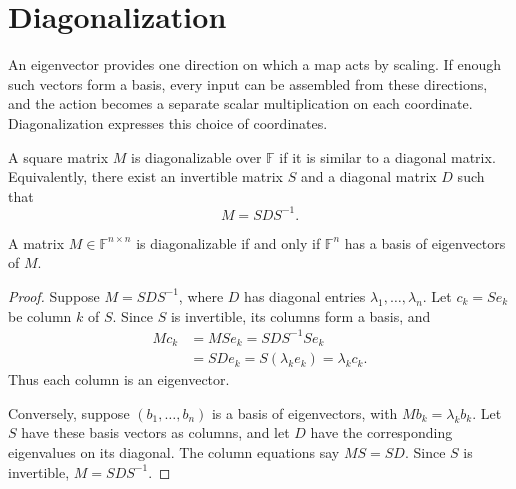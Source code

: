 \section{Diagonalization}
\label{sec:linear-algebra-i:diagonalization}

An eigenvector provides one direction on which a map acts by scaling.
If enough such vectors form a basis, every input can be assembled from
these directions, and the action becomes a separate scalar multiplication
on each coordinate. Diagonalization expresses this choice of coordinates.

\begin{definition}
  A square matrix \(M\) is diagonalizable over \(\mathbb F\) if it is
  similar to a diagonal matrix. Equivalently, there exist an invertible
  matrix \(S\) and a diagonal matrix \(D\) such that
  \[
    M=SDS^{-1}.
  \]
\end{definition}

\begin{theorem}
  \label{thm:linear-algebra-i:diagonalization-eigenbasis}
  A matrix \(M\in\mathbb F^{n\times n}\) is diagonalizable if and only
  if \(\mathbb F^n\) has a basis of eigenvectors of \(M\).
\end{theorem}

\begin{marginfigure}
  \centering
  
  \caption[Diagonalization through coordinates]{The top row acts in
    eigenbasis coordinates. The bottom acts in the original coordinates.
    Both routes give \(MSc=SDc\).}
  \label{fig:linear-algebra-i:diagonalization-coordinates}
\end{marginfigure}

\begin{proof}
  Suppose \(M=SDS^{-1}\), where \(D\) has diagonal entries
  \(\lambda_1,\ldots,\lambda_n\). Let \(c_k=Se_k\) be column \(k\)
  of \(S\). Since \(S\) is invertible, its columns form a basis, and
  \begin{align*}
    Mc_k&=MSe_k=SDS^{-1}Se_k\\
      &=SDe_k=S(\lambda_ke_k)=\lambda_kc_k.
  \end{align*}
  Thus each column is an eigenvector.

  Conversely, suppose \((b_1,\ldots,b_n)\) is a basis of eigenvectors,
  with \(Mb_k=\lambda_kb_k\). Let \(S\) have these basis vectors as
  columns, and let \(D\) have the corresponding eigenvalues on its diagonal.
  The column equations say \(MS=SD\). Since \(S\) is invertible,
  \(M=SDS^{-1}\).
\end{proof}

